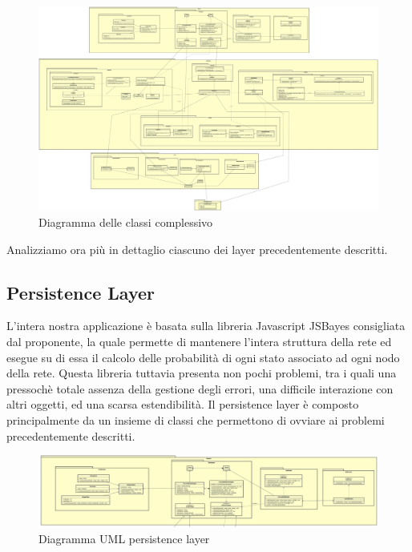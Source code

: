 \begin{figure} [H]
	\centering
	\includegraphics[scale=0.07]{Img/Diagramma_Classi}
	\caption{Diagramma delle classi complessivo}\label{}
\end{figure}
Analizziamo ora più in dettaglio ciascuno dei layer precedentemente descritti.
\subsection{Persistence Layer}
L'intera nostra applicazione è basata sulla libreria Javascript JSBayes consigliata dal proponente, la quale permette di mantenere l'intera struttura della rete ed esegue su di essa il calcolo delle probabilità di ogni stato associato ad ogni nodo della rete.
Questa libreria tuttavia presenta non pochi problemi, tra i quali una pressochè totale assenza della gestione degli errori, una difficile interazione con altri oggetti, ed una scarsa estendibilità.
Il persistence layer è composto principalmente da un insieme di classi che permettono di ovviare ai problemi precedentemente descritti.
\begin{figure} [H]
	\centering
	\includegraphics[scale=0.1]{Img/PersistenceLayer}
	\caption{Diagramma UML persistence layer}\label{}
\end{figure}
